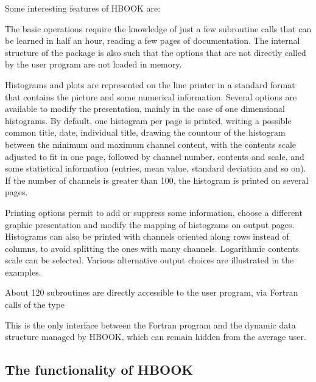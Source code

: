 Some interesting features of HBOOK are:
\begin{UL}
\item The basic operations require the knowledge of just a few
      subroutine calls that can be learned in half an hour, reading a few
      pages of documentation.  
      The internal structure of the
      package is also such that the options that are not directly
      called by the user program are not loaded in memory.
\item Histograms and plots are represented on the line printer in a
      standard format that contains the picture and some numerical 
      information. 
      Several options are available to modify the presentation, 
      mainly in the case of one dimensional histograms.  
      By default, one histogram per page is printed,
      writing a possible common title, date, individual title, drawing
      the countour of the histogram between the minimum and maximum
      channel content, with the contents scale adjusted to fit in one
      page, followed by channel number, contents and scale, and some
      statistical information (entries, mean value, standard deviation
      and so on).  
      If the number of channels is greater than 100, the
      histogram is printed on several pages.
\item Printing options permit to add or suppress some information,
      choose a different graphic presentation and modify the mapping of
      histograms on output pages.  
      Histograms can also be printed with channels
      oriented along rows instead of columns, to avoid splitting the
      ones with many channels. 
      Logarithmic contents scale can be selected.
      Various alternative output choices are illustrated in the examples.
\end{UL}

About 120 subroutines are directly accessible to the user program, via
Fortran calls of the type

\begin{center}
\end{center}

This is the only interface between the Fortran program and the dynamic
data structure managed by HBOOK, which can
remain hidden from the average user.

\subsection*{The functionality of HBOOK}
      

